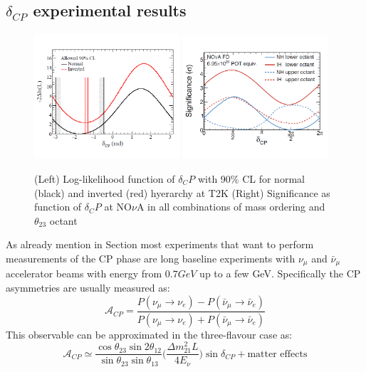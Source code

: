 \documentclass[12pt,a4paper,openright,twoside]{report}
\begin{document}
\subsection{$\delta_{CP}$ experimental results}
\begin{figure}[t]
	\centering
	\includegraphics[width=0.48\textwidth]{cpt2k.png}
	\hfill
	\includegraphics[width=0.48\textwidth]{cpnova.png}
	\caption{\label{cp:fig} (Left) Log-likelihood function of $\delta_CP$ with 90\% CL for normal (black) and inverted (red) hyerarchy at T2K (Right) Significance as function of $\delta_CP$ at NO$\nu$A in all combinations of mass ordering and $\theta_23$ octant }
\end{figure}
As already mention in Section most experiments that want to perform  measurements of the CP phase are long baseline experiments with $\nu_\mu$ and $\bar{\nu}_\mu$ accelerator beams with energy from $0.7 GeV$ up to a few GeV. Specifically the CP asymmetries are usually measured as:
\begin{equation}
\mathcal{A}_{CP}=\frac{P(\nu_\mu \rightarrow \nu_e)- P (\bar{\nu}_\mu\rightarrow \bar{\nu}_e)}{P(\nu_\mu \rightarrow \nu_e)+ P (\bar{\nu}_\mu\rightarrow \bar{\nu}_e)}
\end{equation}
This observable can be approximated in the three-flavour case as:
\begin{equation}
\mathcal{A}_{CP} \simeq \frac{\cos\theta_{23} \sin2\theta_{12}}{\sin\theta_{23}\sin\theta_{13}}\bigg( \frac{\Delta m_{21}^2 L}{4E_\nu}\bigg)\sin\delta_{CP} + \text{matter effects}
\end{equation}
\end{document}
